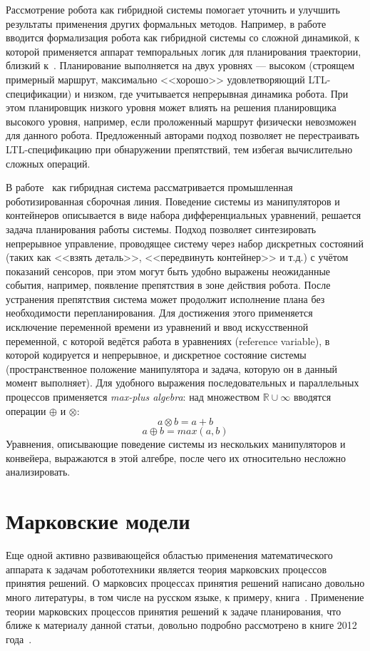 \documentclass[a4, 14pt]{article}
\begin{document}
Рассмотрение робота как гибридной системы помогает уточнить и улучшить результаты
применения других формальных методов. Например, в работе~\cite{maly2013hybrid} вводится
формализация робота как гибридной системы со сложной динамикой, к которой применяется аппарат
темпоральных логик для планирования траектории, близкий к~\cite{kress2007s}. Планирование 
выполняется на двух уровнях --- высоком (строящем примерный маршрут, максимально <<хорошо>> 
удовлетворяющий LTL-спецификации) и низком, где учитывается непрерывная динамика робота.
При этом планировщик низкого уровня может влиять на решения планировщика высокого уровня, 
например, если проложенный маршрут физически невозможен для данного робота.
Предложенный авторами подход позволяет не перестраивать LTL-спецификацию при обнаружении
препятствий, тем избегая вычислительно сложных операций.

В работе~\cite{song2000planning} как гибридная система рассматривается промышленная роботизированная
сборочная линия. Поведение системы из манипуляторов и контейнеров описывается в виде
набора дифференциальных уравнений, решается задача планирования работы системы. 
Подход позволяет синтезировать непрерывное управление, проводящее систему
через набор дискретных состояний (таких как <<взять деталь>>, <<передвинуть контейнер>> и т.д.)
с учётом показаний сенсоров, при этом могут быть удобно выражены неожиданные события, например, появление препятствия
в зоне действия робота. После устранения препятствия система может продолжит исполнение плана
без необходимости перепланирования. Для достижения этого применяется исключение переменной
времени из уравнений и ввод искусственной переменной, с которой ведётся работа в уравнениях
(reference variable), в которой кодируется и непрерывное, и дискретное состояние системы 
(пространственное положение манипулятора и задача, которую он в данный момент выполняет).
Для удобного выражения последовательных и параллельных процессов применяется \textit{max-plus algebra}:
над множеством $\mathbb{R} \cup \infty$ вводятся операции $\oplus$ и $\otimes$:
$$a \otimes b = a + b$$
$$a \oplus b = max(a, b)$$
Уравнения, описывающие поведение системы из нескольких манипуляторов и конвейера,
выражаются в этой алгебре, после чего их относительно несложно анализировать.

\section{Марковские модели}
Еще одной активно развивающейся областью применения математического 
аппарата к задачам робототехники является теория марковских процессов принятия 
решений. О марковсих процессах принятия решений написано довольно много литературы, 
в том  числе на русском языке, к примеру, книга~\cite{main1977markov}. Применение
теории марковских процессов принятия решений к задаче планирования, что ближе к материалу 
данной статьи, довольно подробно рассмотрено в книге 2012 года~\cite{kolobov2012planning}.
\end{document}
